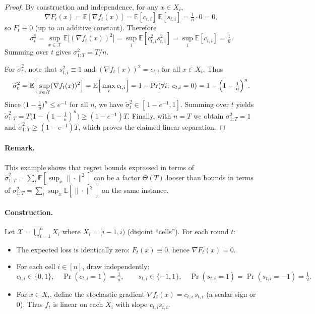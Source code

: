 \documentclass{article}
\theoremstyle{plain}
\theoremstyle{definition}
\theoremstyle{remark}
\newcommand{\cX}{\mathcal{X}}
\renewcommand{\Bbb}{\mathbb}
\newcommand{\E}{{\Bbb E}}
\renewcommand{\tilde}{\widetilde}
\begin{document}
\begin{proof}
By construction and independence, for any $x\in X_i$,
\begin{equation*}
\nabla F_t(x)=\E[\nabla f_t(x)] = \E[c_{t,i}]\,\E[s_{t,i}] = \tfrac1n\cdot 0 = 0,
\end{equation*}
so $F_t\equiv 0$ (up to an additive constant). Therefore
\begin{equation*}
\sigma_t^2
=\sup_{x\in\cX}\E\big[(\nabla f_t(x))^2\big]
=\sup_{i}\E[c_{t,i}^2 s_{t,i}^2]
=\sup_{i}\E[c_{t,i}]
=\tfrac{1}{n}.
\end{equation*}
Summing over $t$ gives $\sigma_{1:T}^2=T/n$.

For $\tilde\sigma_t^2$, note that $s_{t,i}^2\equiv 1$ and $(\nabla f_t(x))^2=c_{t,i}$ for all $x\in X_i$. Thus
\begin{equation*}
\tilde\sigma_t^2
=\E\Big[\sup_{x\in\cX}(\nabla f_t(x))^2\Big]
=\E\Big[\max_{i} c_{t,i}\Big]
=1-\Pr\!\left(\forall i,\;c_{t,i}=0\right)
=1-\Bigl(1-\tfrac1n\Bigr)^{n}.
\end{equation*}
Since $\bigl(1-\tfrac1n\bigr)^n\le e^{-1}$ for all $n$, we have $\tilde\sigma_t^2\in[\,1-e^{-1},1]$.
Summing over $t$ yields $\tilde\sigma_{1:T}^2=T\bigl(1-(1-\tfrac1n)^n\bigr)\ge (1-e^{-1})T$.
Finally, with $n=T$ we obtain $\sigma_{1:T}^2=1$ and $\tilde\sigma_{1:T}^2\ge (1-e^{-1})T$, which proves the claimed linear separation.
\end{proof}

\paragraph{Remark.}
This example shows that regret bounds expressed in terms of $\tilde\sigma_{1:T}^2=\sum_t \E[\sup_x \|\cdot\|^2]$ can be a factor $\Theta(T)$ looser than bounds in terms of $\sigma_{1:T}^2=\sum_t \sup_x \E[\|\cdot\|^2]$ on the same instance.



\iffalse
\paragraph{Construction.} Let $\cX=\bigcup_{i=1}^n X_i$ where $X_i=[i-1,i)$ (disjoint “cells”). For each round $t$:
\begin{itemize}
\item The expected loss is identically zero: $F_t(x)\equiv 0$, hence $\nabla F_t(x)=0$.
\item For each cell $i\in[n]$, draw independently:
\[
c_{t,i}\in\{0,1\},\quad \Pr(c_{t,i}=1)=\tfrac{1}{n},\qquad
s_{t,i}\in\{-1,1\},\quad \Pr(s_{t,i}=1)=\Pr(s_{t,i}=-1)=\tfrac{1}{2}.
\]
\item For $x\in X_i$, define the stochastic gradient $\nabla f_t(x)=c_{t,i}\, s_{t,i}$ (a scalar sign or $0$). Thus $f_t$ is linear on each $X_i$ with slope $c_{t,i}s_{t,i}$.
\end{itemize}
\end{document}
